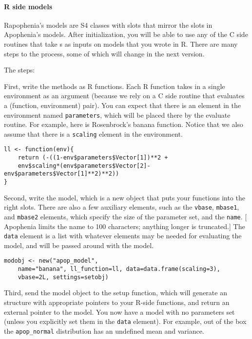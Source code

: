 \documentclass{article}
\begin{document}
\paragraph{R side models}
Rapophenia's models are S4 classes with slots that mirror the slots in Apophenia's models.
After initialization, you will be able to use any of the C side routines that take \am{}s
as inputs on models that you wrote in R. There are many steps to the process, some of
which will change in the next version.

The steps:

First, write the methods as R functions. Each R function takes in a single environment as
an argument (because we rely on a C side routine that evaluates a (function, environment)
pair). You can expect that there is an element in the environment named {\tt parameters},
which will be placed there by the evaluate routine. For example, here is Rosenbrock's
banana function. Notice that we also assume that there is a {\tt scaling} element in the
environment.

\begin{verbatim}
ll <- function(env){
    return (-((1-env$parameters$Vector[1])**2 +
    env$scaling*(env$parameters$Vector[2]-env$parameters$Vector[1]**2)**2))
}
\end{verbatim}

Second, write the model, which is a new object that puts your functions into the right
slots. There are also a few auxiliary elements, such as the {\tt vbase}, {\tt mbase1}, and
{\tt mbase2} elements, which specify the size of the parameter set, and the {\tt name}.
[ Apophenia limits the name to 100 characters; anything longer is truncated.]
The {\tt data} element is a list with whatever elements may be needed for evaluating the
model, and will be passed around with the model.

\begin{verbatim}
modobj <- new("apop_model",
    name="banana", ll_function=ll, data=data.frame(scaling=3), 
    vbase=2L, settings=setobj)
\end{verbatim}

Third, send the model object to the setup function, which will generate an \am structure
with appropriate pointers to your R-side functions, and return an external pointer to the
model. You now have a model with no parameters set (unless you explicitly set them in
the {\tt data} element). For example, out of the box the {\tt apop\_normal} distribution
has an undefined mean and variance.
\end{document}

